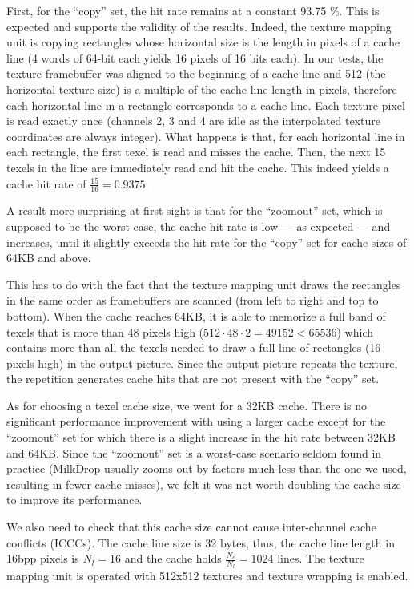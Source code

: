 \documentclass[a4paper,11pt]{kthesis}
\begin{document}
First, for the ``copy'' set, the hit rate remains at a constant 93.75 \%. This is expected and supports the validity of the results. Indeed, the texture mapping unit is copying rectangles whose horizontal size is the length in pixels of a cache line (4 words of 64-bit each yields 16 pixels of 16 bits each). In our tests, the texture framebuffer was aligned to the beginning of a cache line and 512 (the horizontal texture size) is a multiple of the cache line length in pixels, therefore each horizontal line in a rectangle corresponds to a cache line. Each texture pixel is read exactly once (channels 2, 3 and 4 are idle as the interpolated texture coordinates are always integer). What happens is that, for each horizontal line in each rectangle, the first texel is read and misses the cache. Then, the next 15 texels in the line are immediately read and hit the cache. This indeed yields a cache hit rate of $\frac{15}{16} = 0.9375$.

A result more surprising at first sight is that for the ``zoomout'' set, which is supposed to be the worst case, the cache hit rate is low --- as expected --- and increases, until it slightly exceeds the hit rate for the ``copy'' set for cache sizes of 64KB and above.

This has to do with the fact that the texture mapping unit draws the rectangles in the same order as framebuffers are scanned (from left to right and top to bottom). When the cache reaches 64KB, it is able to memorize a full band of texels that is more than 48 pixels high ($512\cdot48\cdot2 = 49152 < 65536$) which contains more than all the texels needed to draw a full line of rectangles (16 pixels high) in the output picture. Since the output picture repeats the texture, the repetition generates cache hits that are not present with the ``copy'' set.

As for choosing a texel cache size, we went for a 32KB cache. There is no significant performance improvement with using a larger cache except for the ``zoomout'' set for which there is a slight increase in the hit rate between 32KB and 64KB. Since the ``zoomout'' set is a worst-case scenario seldom found in practice (MilkDrop usually zooms out by factors much less than the one we used, resulting in fewer cache misses), we felt it was not worth doubling the cache size to improve its performance.

We also need to check that this cache size cannot cause inter-channel cache conflicts (ICCCs). The cache line size is 32 bytes, thus, the cache line length in 16bpp pixels is $N_{l} = 16$ and the cache holds $\frac{N_{c}}{N_{l}}=1024$ lines. The texture mapping unit is operated with 512x512 textures and texture wrapping is enabled.
\end{document}
